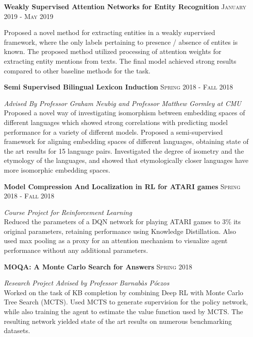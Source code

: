 \headedsection
  {\textbf{Weakly Supervised Attention Networks for Entity Recognition}}
  {\textsc{January 2019 - May 2019}} {%
  
    {
    Proposed a novel method for extracting entities in a weakly supervised framework, where the only labels pertaining to presence / absence of entites is known. The proposed method utilized processing of attention weights for extracting entity mentions from texts. The final model achieved strong results compared to other baseline methods for the task.
    }
}
\headedsection
  {\textbf{Semi Supervised Bilingual Lexicon Induction}}
  {\textsc{Spring 2018 - Fall 2018}} {%
  
    {
    \emph{Advised By Professor Graham Neubig and Professor Matthew Gormley at CMU} \\
    Proposed a novel way of investigating isomorphism between embedding spaces of different languages which showed strong correlations with predicting model performance for a variety of different models. Proposed a semi-supervised framework for aligning embedding spaces of different languages, obtaining state of the art results for 15 language pairs. Investigated the degree of isometry and the etymology of the languages, and showed that etymologically closer languages have more isomorphic embedding spaces.
    }
}
\headedsection
  {\textbf{Model Compression And Localization in RL for ATARI games}}
  {\textsc{Spring 2018 - Fall 2018}} {%
  
    {
    \emph{Course Project for Reinforcement Learning} \\
    Reduced the parameters of a DQN network for playing ATARI games to 3\% its original parameters, retaining performance using Knowledge Distillation. Also used max pooling as a proxy for an attention mechanism to visualize agent performance without any additional parameters.
    }
}
\headedsection
  {\textbf{MOQA: A Monte Carlo Search for Answers}}
  {\textsc{Spring 2018}} {%
  
    {
    \emph{Research Project Advised by Professor Barnab\`as P\'oczos} \\
    Worked on the task of KB completion by combining Deep RL with Monte Carlo Tree Search (MCTS). Used MCTS to generate supervision for the policy network, while also training the agent to estimate the value function used by MCTS. The resulting network yielded state of the art results on numerous benchmarking datasets.
    }
}

